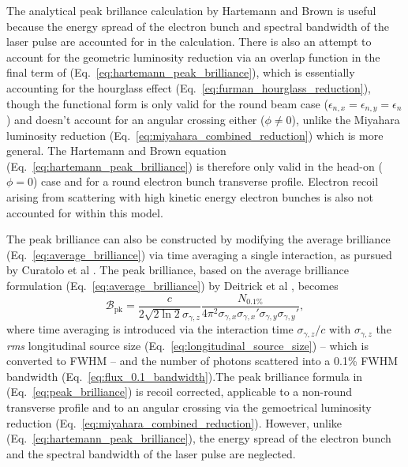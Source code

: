\documentclass[../main.tex]{subfiles}
\begin{document}
The analytical peak brillance calculation by Hartemann and Brown \cite{hartemann2005high} is useful because the energy spread of the electron bunch and spectral bandwidth of the laser pulse are accounted for in the calculation. There is also an attempt to account for the geometric luminosity reduction via an overlap function in the final term of (Eq.~\ref{eq:hartemann_peak_brilliance}), which is essentially accounting for the hourglass effect \cite{furman1991hourglass} (Eq.~\ref{eq:furman_hourglass_reduction}), though the functional form is only valid for the round beam case ($\epsilon_{n,x} = \epsilon_{n,y} = \epsilon_{n}$) and doesn't account for an angular crossing either ($\phi\neq0$), unlike the Miyahara luminosity reduction \cite{miyahara2008luminosity} (Eq.~\ref{eq:miyahara_combined_reduction}) which is more general. The Hartemann and Brown equation (Eq.~\ref{eq:hartemann_peak_brilliance}) is therefore only valid in the head-on ($\phi=0$) case and for a round electron bunch transverse profile. Electron recoil arising from scattering with high kinetic energy electron bunches is also not accounted for within this model.

The peak brilliance can also be constructed by modifying the average brilliance (Eq.~\ref{eq:average_brilliance}) via time averaging a single interaction, as pursued by Curatolo et al \cite{curatolo2017analytical}. The peak brilliance, based on the average brilliance formulation (Eq.~\ref{eq:average_brilliance}) by Deitrick et al \cite{deitrick2018high}, becomes
\begin{equation}
\mathcal{B}_{\mathrm{pk}} = \frac{c}{2\sqrt{2\ln2}\sigma_{\gamma,z}}\frac{N_{0.1\%}}{4\pi^{2}\sigma_{\gamma,x}\sigma_{\gamma,x}'\sigma_{\gamma,y}\sigma_{\gamma,y}'},
\label{eq:peak_brilliance}    
\end{equation}
where time averaging is introduced via the interaction time $\sigma_{\gamma,z}/c$ with $\sigma_{\gamma,z}$ the \textit{rms} longitudinal source size (Eq.~\ref{eq:longitudinal_source_size}) -- which is converted to FWHM -- and the number of photons scattered into a 0.1\% FWHM bandwidth (Eq.~\ref{eq:flux_0.1_bandwidth}).The peak brilliance formula in (Eq.~\ref{eq:peak_brilliance}) is recoil corrected, applicable to a non-round transverse profile and to an angular crossing via the gemoetrical luminosity reduction (Eq.~\ref{eq:miyahara_combined_reduction}). However, unlike (Eq.~\ref{eq:hartemann_peak_brilliance}), the energy spread of the electron bunch and the spectral bandwidth of the laser pulse are neglected. 
\end{document}
